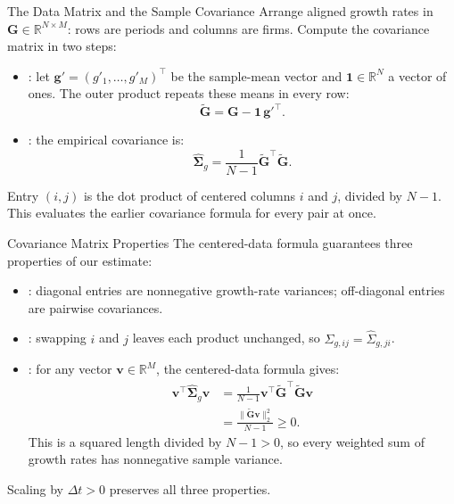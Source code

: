 \documentclass[aspectratio=169,11pt]{beamer}
\newcommand{\bG}{\mathbf{G}}
\newcommand{\bg}{\mathbf{g}}
\newcommand{\Sg}{\hat{\boldsymbol{\Sigma}}_{g}}
\begin{document}
\begin{frame}{The Data Matrix and the Sample Covariance}
  Arrange aligned growth rates in $\bG\in\mathbb R^{N\times M}$:
  rows are periods and columns are firms. Compute the covariance matrix
  in two steps:

  \vspace{0.5em}
  \begin{itemize}\setlength{\itemsep}{0.6em}
    \item {}: let $\bg'=(g'_1,\ldots,g'_M)^{\top}$
      be the sample-mean vector and $\mathbf 1\in\mathbb R^N$ a vector of ones.
      The outer product repeats these means in every row:
      \[
        \tilde{\bG}=\bG-\mathbf 1\,\bg'^{\top}.
      \]
    \item {}: the empirical covariance is:
      \[
        \boxed{\Sg=\frac{1}{N-1}\tilde{\bG}^{\top}\tilde{\bG}.}
      \]
  \end{itemize}

  \vspace{0.4em}
  Entry $(i,j)$ is the dot product of centered columns $i$ and $j$, divided
  by $N-1$. This evaluates the earlier covariance formula for every pair at once.
\end{frame}

\begin{frame}{Covariance Matrix Properties}
  The centered-data formula guarantees three properties of our estimate:

  \vspace{0.4em}
  \begin{itemize}\setlength{\itemsep}{0.5em}
    \item {}: diagonal entries are nonnegative growth-rate
      variances; off-diagonal entries are pairwise covariances.
    \item {}: swapping $i$ and $j$ leaves each product unchanged,
      so $\hat\Sigma_{g,ij}=\hat\Sigma_{g,ji}$.
    \item {}: for any vector $\mathbf v\in\mathbb R^M$,
      the centered-data formula gives:
      \[
        \begin{aligned}
          \mathbf v^{\top}\Sg\mathbf v
          &=\frac{1}{N-1}\mathbf v^{\top}\tilde{\bG}^{\top}\tilde{\bG}\mathbf v\\[0.3em]
          &=\frac{\lVert\tilde{\bG}\mathbf v\rVert_2^2}{N-1}\ge0.
        \end{aligned}
      \]
      This is a squared length divided by $N-1>0$, so every weighted sum
      of growth rates has nonnegative sample variance.
  \end{itemize}

  \vspace{0.4em}
  Scaling by $\Delta t>0$ preserves all three properties.
\end{frame}
\end{document}
